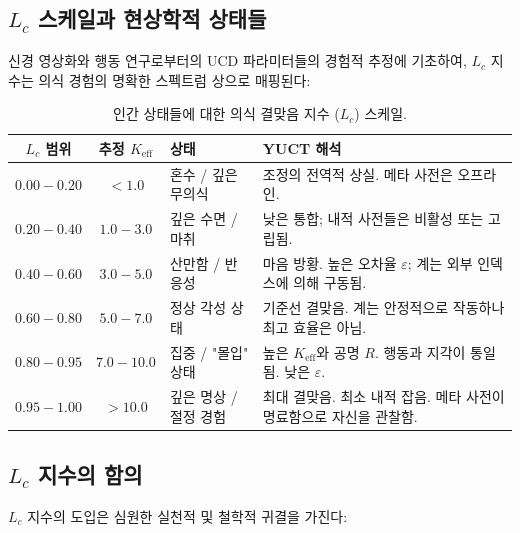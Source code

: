 \documentclass[12pt,a4paper]{article}
\begin{document}
	\subsection{\(L_c\) 스케일과 현상학적 상태들}
	
	신경 영상화와 행동 연구로부터의 UCD 파라미터들의 경험적 추정에 기초하여, \(L_c\) 지수는 의식 경험의 명확한 스펙트럼 상으로 매핑된다:
	
	\begin{table}[H]
		\centering
		\caption{인간 상태들에 대한 의식 결맞음 지수 (\(L_c\)) 스케일.}
		\label{tab:Lc-scale}
		\begin{tabular}{c c l p{6cm}}
			\toprule
			\textbf{\(L_c\) 범위} & \textbf{추정 \(K_{\mathrm{eff}}\)} & \textbf{상태} & \textbf{YUCT 해석} \\
			\midrule
			\(0.00 - 0.20\) & \(< 1.0\) & 혼수 / 깊은 무의식 & 조정의 전역적 상실. 메타 사전은 오프라인. \\
			\(0.20 - 0.40\) & \(1.0 - 3.0\) & 깊은 수면 / 마취 & 낮은 통합; 내적 사전들은 비활성 또는 고립됨. \\
			\(0.40 - 0.60\) & \(3.0 - 5.0\) & 산만함 / 반응성 & 마음 방황. 높은 오차율 \(\varepsilon\); 계는 외부 인덱스에 의해 구동됨. \\
			\(0.60 - 0.80\) & \(5.0 - 7.0\) & 정상 각성 상태 & 기준선 결맞음. 계는 안정적으로 작동하나 최고 효율은 아님. \\
			\(0.80 - 0.95\) & \(7.0 - 10.0\) & 집중 / "몰입" 상태 & 높은 \(K_{\mathrm{eff}}\)와 공명 \(R\). 행동과 지각이 통일됨. 낮은 \(\varepsilon\). \\
			\(0.95 - 1.00\) & \(> 10.0\) & 깊은 명상 / 절정 경험 & 최대 결맞음. 최소 내적 잡음. 메타 사전이 명료함으로 자신을 관찰함. \\
			\bottomrule
		\end{tabular}
	\end{table}
	
	\subsection{\(L_c\) 지수의 함의}
	
	\(L_c\) 지수의 도입은 심원한 실천적 및 철학적 귀결을 가진다:
	
\end{document}
